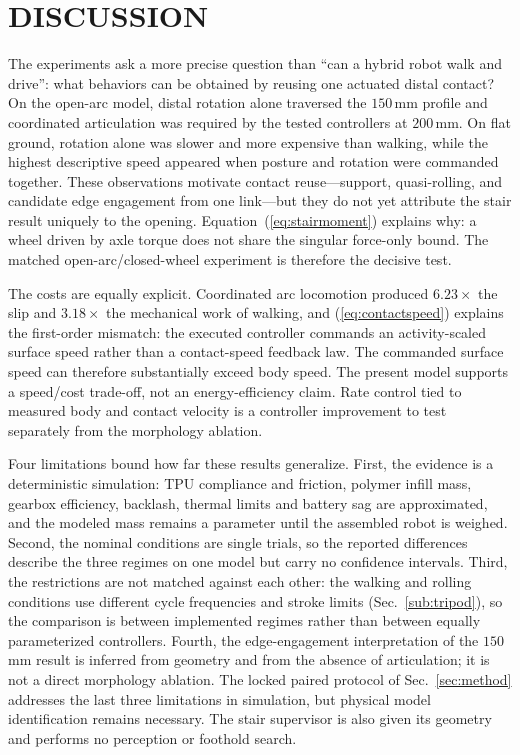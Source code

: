 \section{DISCUSSION}

The experiments ask a more precise question than ``can a hybrid robot walk and
drive'': what behaviors can be obtained by reusing one actuated distal contact?
On the open-arc model, distal rotation alone traversed the $150\,$mm profile and
coordinated articulation was required by the tested controllers at $200\,$mm.
On flat ground, rotation alone was slower and more expensive than walking, while
the highest descriptive speed appeared when posture and rotation were commanded
together. These observations motivate contact reuse---support, quasi-rolling,
and candidate edge engagement from one link---but they do not yet attribute the
stair result uniquely to the opening. Equation~(\ref{eq:stairmoment}) explains
why: a wheel driven by axle torque does not share the singular force-only bound.
The matched open-arc/closed-wheel experiment is therefore the decisive test.

The costs are equally explicit. Coordinated arc locomotion produced
$6.23\times$ the slip and $3.18\times$ the mechanical work of walking, and
(\ref{eq:contactspeed}) explains the first-order mismatch: the executed
controller commands an activity-scaled surface speed rather than a contact-speed
feedback law. The commanded surface speed can therefore substantially exceed
body speed. The present model supports a speed/cost trade-off, not an
energy-efficiency claim. Rate control tied to measured body and contact velocity
is a controller improvement to test separately from the morphology ablation.

Four limitations bound how far these results generalize. First, the evidence is
a deterministic simulation: TPU compliance and friction, polymer infill mass,
gearbox efficiency, backlash, thermal limits and battery sag are approximated,
and the modeled mass remains a parameter until the assembled robot is weighed.
Second, the nominal conditions are single trials, so the reported differences
describe the three regimes on one model but carry no confidence intervals.
Third, the restrictions are not matched against each other: the walking and
rolling conditions use different cycle frequencies and stroke limits
(Sec.~\ref{sub:tripod}), so the comparison is between implemented regimes rather
than between equally parameterized controllers. Fourth, the edge-engagement
interpretation of the $150\,$mm result is inferred from geometry and from the
absence of articulation; it is not a direct morphology ablation. The locked
paired protocol of Sec.~\ref{sec:method} addresses the last three limitations in
simulation, but physical model identification remains necessary. The stair
supervisor is also given its geometry and performs no perception or foothold
search.

